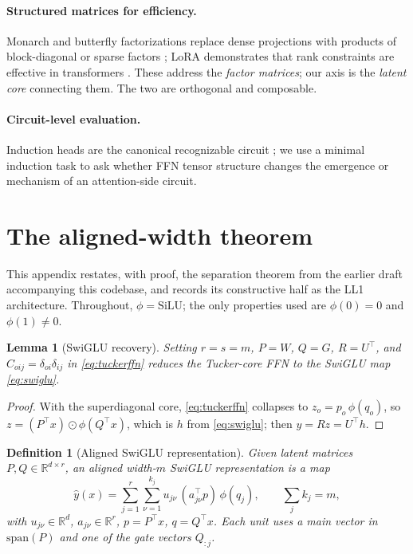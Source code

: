 \documentclass[11pt]{article}
\newtheorem{lemma}{Lemma}
\newtheorem{definition}{Definition}
\newcommand{\R}{\mathbb{R}}
\newcommand{\silu}{\mathrm{SiLU}}
\newcommand{\T}{^{\top}}
\begin{document}
\paragraph{Structured matrices for efficiency.}
Monarch and butterfly factorizations replace dense projections with products of
block-diagonal or sparse factors \citep{dao2022monarch,dao2019butterfly}; LoRA
demonstrates that rank constraints are effective in transformers \citep{hu2022lora}.
These address the \emph{factor matrices}; our axis is the \emph{latent core}
connecting them. The two are orthogonal and composable.

\paragraph{Circuit-level evaluation.}
Induction heads are the canonical recognizable circuit
\citep{elhage2021mathematical,olsson2022context}; we use a minimal induction task to
ask whether FFN tensor structure changes the emergence or mechanism of an
attention-side circuit.




\appendix

\section{The aligned-width theorem}
\label{app:theorem}

This appendix restates, with proof, the separation theorem from the earlier draft
accompanying this codebase, and records its constructive half as the LL1
architecture. Throughout, $\phi = \silu$; the only properties used are $\phi(0)=0$
and $\phi(1) \ne 0$.

\begin{lemma}[SwiGLU recovery]
\label{lem:recovery}
Setting $r=s=m$, $P=W$, $Q=G$, $R=U\T$, and $C_{oij} = \delta_{oi}\delta_{ij}$ in
\eqref{eq:tuckerffn} reduces the Tucker-core FFN to the SwiGLU map \eqref{eq:swiglu}.
\end{lemma}

\begin{proof}
With the superdiagonal core, \eqref{eq:tuckerffn} collapses to
$z_o = p_o\,\phi(q_o)$, so $z = (P\T x) \odot \phi(Q\T x)$, which is $h$ from
\eqref{eq:swiglu}; then $y = Rz = U\T h$.
\end{proof}

\begin{definition}[Aligned SwiGLU representation]
\label{def:aligned}
Given latent matrices $P, Q \in \R^{d\times r}$, an \emph{aligned width-$m$ SwiGLU
representation} is a map
\[
\hat y(x) = \sum_{j=1}^{r} \sum_{\nu=1}^{k_j} u_{j\nu}\, (a_{j\nu}\T p)\,\phi(q_j),
\qquad \textstyle\sum_j k_j = m,
\]
with $u_{j\nu} \in \R^d$, $a_{j\nu} \in \R^r$, $p = P\T x$, $q = Q\T x$. Each unit
uses a main vector in $\mathrm{span}(P)$ and one of the gate vectors $Q_{:j}$.
\end{definition}
\end{document}

